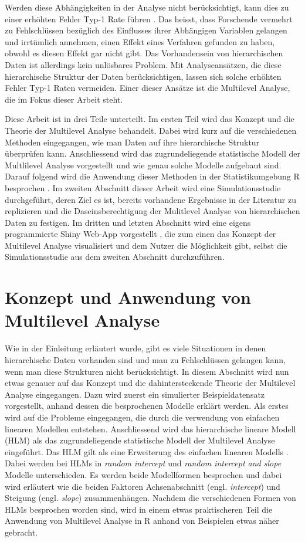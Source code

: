 \documentclass[12pt]{article}\usepackage[]{graphicx}\usepackage[]{color}
\numberwithin{equation}{section}
\begin{document}
Werden diese Abhängigkeiten in der Analyse nicht berücksichtigt, kann dies zu einer erhöhten Fehler Typ-1 Rate führen \citep{dorman2008effect, mcneish2014analyzing}. Das heisst, dass Forschende vermehrt zu Fehlschlüssen bezüglich des Einflusses ihrer Abhängigen Variablen gelangen und irrtümlich annehmen, einen Effekt eines Verfahren gefunden zu haben, obwohl es diesen Effekt gar nicht gibt. Das Vorhandensein von hierarchischen Daten ist allerdings kein unlösbares Problem. Mit Analyseansätzen, die diese hierarchische Struktur der Daten berücksichtigen, lassen sich solche erhöhten Fehler Typ-1 Raten vermeiden. Einer dieser Ansätze ist die Multilevel Analyse, die im Fokus dieser Arbeit steht.

Diese Arbeit ist in drei Teile unterteilt. Im ersten Teil wird das Konzept und die Theorie der Multilevel Analyse behandelt. Dabei wird kurz auf die verschiedenen Methoden eingegangen, wie man Daten auf ihre hierarchische Struktur überprüfen kann. Anschliessend wird das zugrundeliegende statistische Modell der Multlilevel Analyse vorgestellt und wie genau solche Modelle aufgebaut sind. Darauf folgend wird die Anwendung dieser Methoden in der Statistikumgebung R besprochen \citep{R}. Im zweiten Abschnitt dieser Arbeit wird eine Simulationsstudie durchgeführt, deren Ziel es ist, bereits vorhandene Ergebnisse in der Literatur zu replizieren und die Daseinsberechtigung der Mulitlevel Analyse von hierarchischen Daten zu festigen. Im dritten und letzten Abschnitt wird eine eigens programmierte Shiny Web-App vorgestellt \citep{shiny}, die zum einen das Konzept der Multilevel Analyse visualisiert und dem Nutzer die Möglichkeit gibt, selbst die Simulationsstudie aus dem zweiten Abschnitt durchzuführen. 

\section{Konzept und Anwendung von Multilevel Analyse}
Wie in der Einleitung erläutert wurde, gibt es viele Situationen in denen hierarchische Daten vorhanden sind und man zu Fehlschlüssen gelangen kann, wenn man diese Strukturen nicht berücksichtigt. In diesem Abschnitt wird nun etwas genauer auf das Konzept und die dahintersteckende Theorie der Multilevel Analyse eingegangen. Dazu wird zuerst ein simulierter Beispieldatensatz vorgestellt, anhand dessen die besprochenen Modelle erklärt werden. Als erstes wird auf die Probleme eingegangen, die durch die verwendung von einfachen linearen Modellen entstehen. Anschliessend wird das hierarchische lineare Modell (HLM) als das zugrundeliegende statistische Modell der Multilevel Analyse eingeführt. Das HLM gilt als eine Erweiterung des einfachen linearen Modells \cite{SnijdersTomA.B2012Ma:a}. Dabei werden bei HLMs in \textit{random intercept} und \textit{random intercept and slope} Modelle unterschieden. Es werden beide Modellformen besprochen und dabei wird erläutert wie die beiden Faktoren Achsenabschnitt (engl. \textit{intercept}) und Steigung (engl. \textit{slope}) zusammenhängen. Nachdem die verschiedenen Formen von HLMs besprochen worden sind, wird in einem etwas praktischeren Teil die Anwendung von Multilevel Analyse in R anhand von Beispielen etwas näher gebracht.
\end{document}
